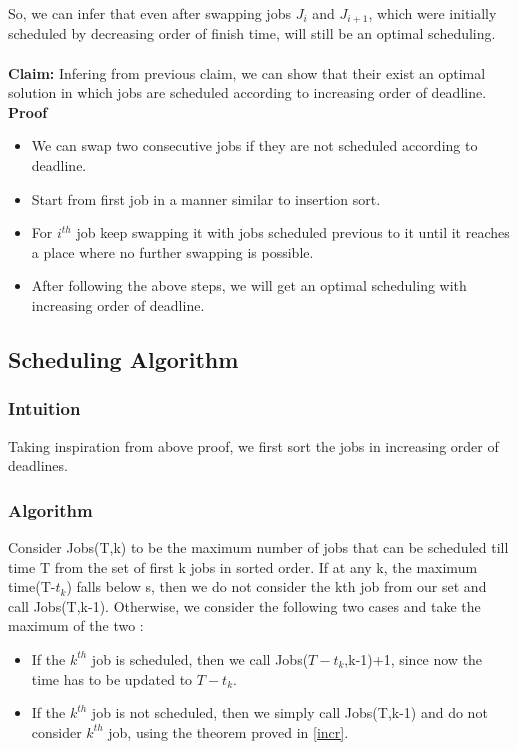 \documentclass{article}
\begin{document}
So, we can infer that even after swapping jobs $J_i$ and $J_{i+1}$, which were initially scheduled by decreasing order of finish time, will still be an optimal scheduling. \\ \\
\textbf{Claim:} Infering from previous claim, we can show that their exist an optimal solution in which jobs are scheduled according to increasing order of deadline. \\
\textbf{Proof} 
\begin{itemize}
\item We can swap two consecutive jobs if they are not scheduled according to deadline.
\item Start from first job in a manner similar to insertion sort. 
\item For $i^{th}$ job keep swapping it with jobs scheduled previous to it until it reaches a place where no further swapping is possible.
\item After following the above steps, we will get an optimal scheduling with increasing order of deadline.
\end{itemize}


\subsection{Scheduling Algorithm}
\subsubsection{Intuition}
Taking inspiration from above proof, we first sort the jobs in increasing order of deadlines. 

\subsubsection{Algorithm}
Consider Jobs(T,k) to be the maximum number of jobs that can be scheduled till time T from the set of first k jobs in sorted order. If at any k, the maximum time(T-$t_k$) falls below s, then we do not consider the kth job from our set and call Jobs(T,k-1). Otherwise, we consider the following two cases and take the maximum of the two :
\begin{itemize}
\item If the $k^{th}$ job is scheduled, then we call Jobs($T-t_k$,k-1)+1, since now the time has to be updated to $T-t_k$.
\item If the $k^{th}$ job is not scheduled, then we simply call Jobs(T,k-1) and do not consider $k^{th}$ job, using the theorem proved in \ref{incr}.
\end{itemize}
\end{document}
